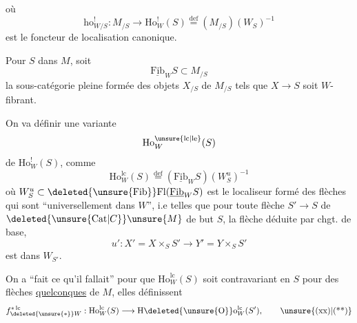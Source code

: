 
où
\[
\mathrm{ho}^{!}_{W/S}:M_{/S}\longrightarrow\mathrm{Ho}^{!}_W(S)\overset{\mathrm{def}}{=}(M_{/S})(W_S)^{-1}
\]
est le foncteur de localisation canonique.

Pour  $S$ dans $M$, soit
\[
\underline{\mathrm{Fib}}_W S\subset M_{/S}
\]
la sous-catégorie pleine formée des objets $X_{/S}$ de $M_{/S}$ tels que $X\to S$ soit $W$-fibrant.

On va définir une variante
\[
\mathrm{Ho}^{\unsure{\mathrm{lc}|\mathrm{le}}}_W(S)
\]
 de $\mathrm{Ho}^{!}_W(S)$, comme
\[
\mathrm{Ho}^{\mathrm{lc}}_W(S)\overset{\mathrm{def}}{=}(\underline{\mathrm{Fib}}_W S)(W_S^{u})^{-1}
\]
où $W_S^{u}\subset\deleted{\unsure{\mathrm{Fib}}}\mathrm{Fl}(\underline{\mathrm{Fib}}_W S)$ est le localiseur formé des flèches  qui sont ``universellement  dans $W$'', i.e telles que pour toute flèche $S'\to S$ de $\deleted{\unsure{\mathrm{Cat}|C}}\unsure{M}$ de but $S$, la flèche déduite par chgt. de base,
\[
u':X'=X\times_S S'\longrightarrow Y'=Y\times_S S'
\]
est dans $W_{S'}$.

On a ``fait ce qu'il fallait'' pour que $\mathrm{Ho}^{\mathrm{lc}}_W(S)$ soit contravariant en $S$ pour des flèches \uline{quelconques}  de $M$, elles définissent
\[
f_{\deleted{\unsure{*}}W}^{*\,\mathrm{lc}}:\mathrm{Ho}^{\mathrm{lc}}_W(S)\longrightarrow \mathrm{H}\deleted{\unsure{\mathrm{O}}}\mathrm{o}^{\mathrm{lc}}_W(S'),\tag*{\unsure{(xx)|(**)}}
\]
